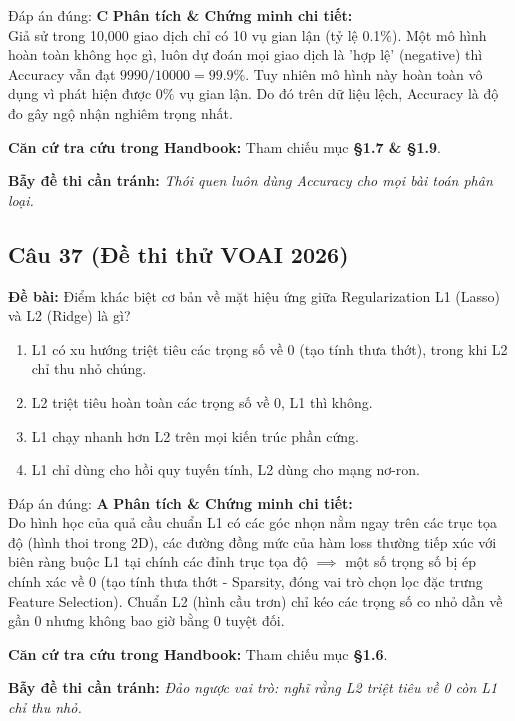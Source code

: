\documentclass[10pt,a4paper]{article}
\begin{document}
\begin{solbox}{Đáp án đúng: \textbf{C}}
\textbf{Phân tích \& Chứng minh chi tiết:} \\
Giả sử trong 10,000 giao dịch chỉ có 10 vụ gian lận (tỷ lệ 0.1\%). Một mô hình hoàn toàn không học gì, luôn dự đoán mọi giao dịch là 'hợp lệ' (negative) thì Accuracy vẫn đạt $9990/10000 = 99.9\%$. Tuy nhiên mô hình này hoàn toàn vô dụng vì phát hiện được $0\%$ vụ gian lận. Do đó trên dữ liệu lệch, Accuracy là độ đo gây ngộ nhận nghiêm trọng nhất.

\vspace{0.4em}
\textbf{Căn cứ tra cứu trong Handbook:} Tham chiếu mục \textbf{§1.7 \& §1.9}.

\vspace{0.4em}
\textbf{Bẫy đề thi cần tránh:} \textit{Thói quen luôn dùng Accuracy cho mọi bài toán phân loại.}
\end{solbox}
\vspace{0.5em}


\subsection*{Câu 37 (Đề thi thử VOAI 2026)}
\textbf{Đề bài:} Điểm khác biệt cơ bản về mặt hiệu ứng giữa Regularization L1 (Lasso) và L2 (Ridge) là gì?

\begin{enumerate}[label=\textbf{\Alph*.}]
    \item L1 có xu hướng triệt tiêu các trọng số về 0 (tạo tính thưa thớt), trong khi L2 chỉ thu nhỏ chúng.
    \item L2 triệt tiêu hoàn toàn các trọng số về 0, L1 thì không.
    \item L1 chạy nhanh hơn L2 trên mọi kiến trúc phần cứng.
    \item L1 chỉ dùng cho hồi quy tuyến tính, L2 dùng cho mạng nơ-ron.
\end{enumerate}

\begin{solbox}{Đáp án đúng: \textbf{A}}
\textbf{Phân tích \& Chứng minh chi tiết:} \\
Do hình học của quả cầu chuẩn L1 có các góc nhọn nằm ngay trên các trục tọa độ (hình thoi trong 2D), các đường đồng mức của hàm loss thường tiếp xúc với biên ràng buộc L1 tại chính các đỉnh trục tọa độ $\implies$ một số trọng số bị ép chính xác về 0 (tạo tính thưa thớt - Sparsity, đóng vai trò chọn lọc đặc trưng Feature Selection). Chuẩn L2 (hình cầu trơn) chỉ kéo các trọng số co nhỏ dần về gần 0 nhưng không bao giờ bằng 0 tuyệt đối.

\vspace{0.4em}
\textbf{Căn cứ tra cứu trong Handbook:} Tham chiếu mục \textbf{§1.6}.

\vspace{0.4em}
\textbf{Bẫy đề thi cần tránh:} \textit{Đảo ngược vai trò: nghĩ rằng L2 triệt tiêu về 0 còn L1 chỉ thu nhỏ.}
\end{solbox}
\vspace{0.5em}
\end{document}
